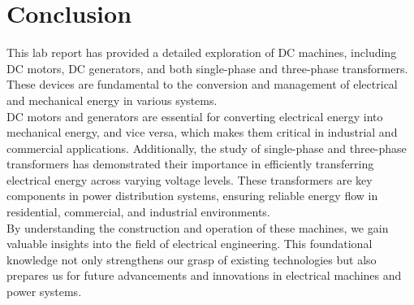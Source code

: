 \documentclass[a4paper,12pt]{article}
\begin{document}
	
\section{Conclusion}
This lab report has provided a detailed exploration of DC machines, including DC motors, DC generators, and both single-phase and three-phase transformers. These devices are fundamental to the conversion and management of electrical and mechanical energy in various systems.\\

DC motors and generators are essential for converting electrical energy into mechanical energy, and vice versa, which makes them critical in industrial and commercial applications. Additionally, the study of single-phase and three-phase transformers has demonstrated their importance in efficiently transferring electrical energy across varying voltage levels. These transformers are key components in power distribution systems, ensuring reliable energy flow in residential, commercial, and industrial environments.\\

By understanding the construction and operation of these machines, we gain valuable insights into the field of electrical engineering. This foundational knowledge not only strengthens our grasp of existing technologies but also prepares us for future advancements and innovations in electrical machines and power systems.


	
	
	
	
\end{document}
